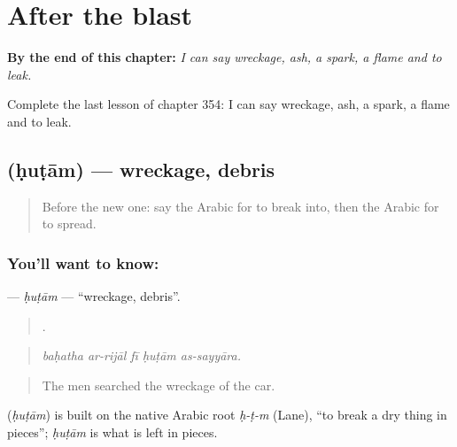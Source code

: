 
\chapter{After the blast}
\label{ch:ar-after-the-blast}

\begin{chapteropening}
\textbf{By the end of this chapter:} \emph{I can say wreckage, ash, a spark, a flame and to leak.}

Complete the last lesson of chapter 354: I can say wreckage, ash, a spark, a flame and to leak.
\end{chapteropening}

\section[\texorpdfstring{\ar{حطام} (ḥuṭām)}{حطام (ḥuṭām)}]{ (ḥuṭām) — wreckage, debris}

\label{lesson:AR-C354-hutam}



\begin{quote}
Before the new one: say the Arabic for to break into, then the Arabic for to spread.
\end{quote}

\subsection*{You'll want to know: }
\textbf{} — \emph{ḥuṭām} — \textquotedblleft{}wreckage, debris\textquotedblright{}.

\begin{quote}
    .
\end{quote}

\begin{quote}
\emph{baḥatha ar-rijāl fī ḥuṭām as-sayyāra.}
\end{quote}

\begin{quote}
The men searched the wreckage of the car.
\end{quote}

\begin{cousinweb}
\textbf{} (\emph{ḥuṭām}) is built on the native Arabic root \emph{ḥ-ṭ-m} (Lane), \textquotedblleft{}to break a dry thing in pieces\textquotedblright{}; \emph{ḥuṭām} is what is left in pieces.
\end{cousinweb}

